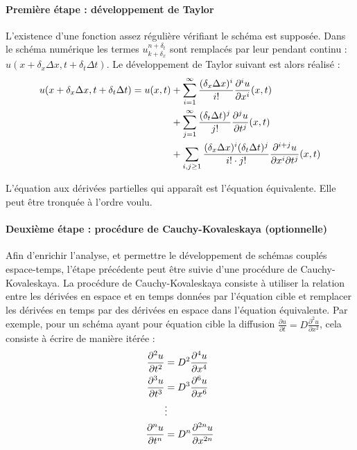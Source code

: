         \paragraph{Première étape : développement de Taylor}

        L'existence d'une fonction assez régulière vérifiant le schéma est supposée.
        Dans le schéma numérique les termes $u^{n+\delta_t}_{k+\delta_x}$ sont remplacés par leur pendant
        continu : $u(x+\delta_x \Delta x, t + \delta_t \Delta t)$. Le développement de Taylor suivant est alors réalisé :
        \begin{align}
        u(x+\delta_x \Delta x, t + \delta_t \Delta t) = u(x,t)
        &+ \sum_{i=1}^{\infty} \frac{(\delta_x \Delta x)^i}{i!}
        \frac{\partial^i u}{\partial x^i}(x,t) \notag \\
        &+ \sum_{j=1}^{\infty} \frac{(\delta_t \Delta t)^j}{j!}
        \frac{\partial^j u}{\partial t^j}(x,t) \notag \\
        &+ \sum_{i,j \geq 1} \frac{(\delta_x \Delta x)^i (\delta_t \Delta t)^j}{i! \cdot j!}
        \frac{\partial^{i+j} u}{\partial x^i \partial t^j}(x,t)
        \end{align}

        L'équation aux dérivées partielles qui apparaît est l'équation équivalente. Elle peut être tronquée à l'ordre voulu.

        \paragraph{Deuxième étape : procédure de Cauchy-Kovaleskaya (optionnelle)}

        Afin d'enrichir l'analyse, et permettre le développement de schémas couplés espace-temps, l'étape précédente peut être suivie d'une procédure de Cauchy-Kovaleskaya.
        La procédure de Cauchy-Kovaleskaya consiste à utiliser la relation entre les dérivées en espace et en temps données par l'équation cible et remplacer les dérivées en temps par des dérivées en espace dans l'équation équivalente.
        Par exemple, pour un schéma ayant pour équation cible la diffusion $\frac{\partial u}{\partial t} = D \frac{\partial^2 u}{\partial x^2}$, cela consiste à écrire de manière itérée :
        \begin{align}
        \frac{\partial^2 u}{\partial t^2} &= D^2 \frac{\partial^4 u}{\partial x^4} \notag \\
        \frac{\partial^3 u}{\partial t^3} &= D^3 \frac{\partial^6 u}{\partial x^6} \notag \\
        &\vdots \notag \\
        \frac{\partial^n u}{\partial t^n} &= D^n \frac{\partial^{2n} u}{\partial x^{2n}}
        \end{align}

